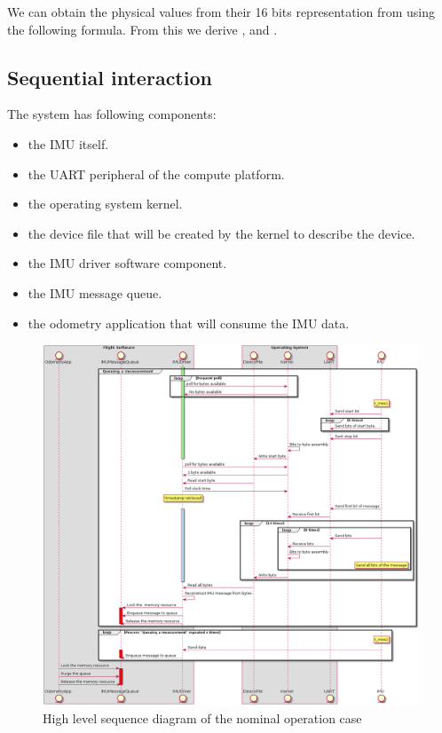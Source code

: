 We can obtain the physical values from their 16 bits representation from using the following formula.
From this we derive ,  and .

\subsection{Sequential interaction}
The system has following components:
\begin{itemize}
    \item the IMU itself.
    \item the UART peripheral of the compute platform.
    \item the operating system kernel.
    \item the device file that will be created by the kernel to describe the device.
    \item the IMU driver software component.
    \item the IMU message queue.
    \item the odometry application that will consume the IMU data.
\end{itemize}

\begin{figure}[H]
    \centering
    \includegraphics[width=1.0 \textwidth]{diagrams/high_level_sys_overview.png}
    \caption{High level sequence diagram of the nominal operation case}
    \label{fig-high-level-nominal}
\end{figure}

